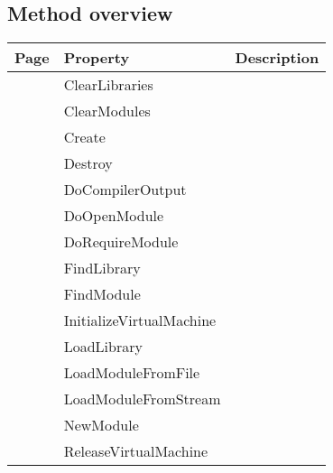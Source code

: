 \subsection{Method overview}
\label{thoriumcore:thorium:tthorium:methods}
\begin{tabularx}{\textwidth}{llX}
Page & Property & Description  \\ \hline
\pageref{thoriumcore:thorium:tthorium:clearlibraries} & ClearLibraries  &  \\
\pageref{thoriumcore:thorium:tthorium:clearmodules} & ClearModules  &  \\
\pageref{thoriumcore:thorium:tthorium:create} & Create  &  \\
\pageref{thoriumcore:thorium:tthorium:destroy} & Destroy  &  \\
\pageref{thoriumcore:thorium:tthorium:docompileroutput} & DoCompilerOutput  &  \\
\pageref{thoriumcore:thorium:tthorium:doopenmodule} & DoOpenModule  &  \\
\pageref{thoriumcore:thorium:tthorium:dorequiremodule} & DoRequireModule  &  \\
\pageref{thoriumcore:thorium:tthorium:findlibrary} & FindLibrary  &  \\
\pageref{thoriumcore:thorium:tthorium:findmodule} & FindModule  &  \\
\pageref{thoriumcore:thorium:tthorium:initializevirtualmachine} & InitializeVirtualMachine  &  \\
\pageref{thoriumcore:thorium:tthorium:loadlibrary} & LoadLibrary  &  \\
\pageref{thoriumcore:thorium:tthorium:loadmodulefromfile} & LoadModuleFromFile  &  \\
\pageref{thoriumcore:thorium:tthorium:loadmodulefromstream} & LoadModuleFromStream  &  \\
\pageref{thoriumcore:thorium:tthorium:newmodule} & NewModule  &  \\
\pageref{thoriumcore:thorium:tthorium:releasevirtualmachine} & ReleaseVirtualMachine  &  \\
\hline
\end{tabularx}
